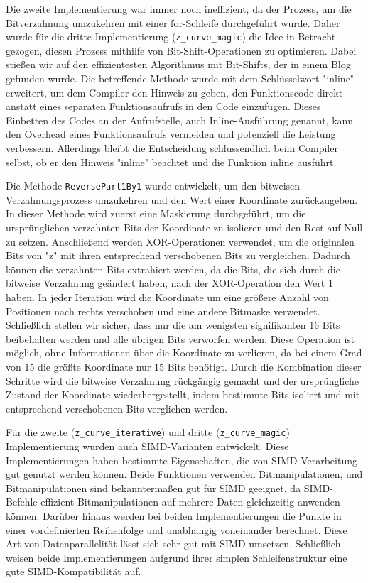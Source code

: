 \documentclass[course=erap]{aspdoc}
\begin{document}
\noindent Die zweite Implementierung war immer noch ineffizient, da der Prozess, um die Bitverzahnung umzukehren mit einer for-Schleife durchgeführt wurde. Daher wurde für die dritte Implementierung (\texttt{z\_curve\_magic}) die Idee in Betracht gezogen, diesen Prozess mithilfe von Bit-Shift-Operationen zu optimieren. Dabei stießen wir auf den effizientesten Algorithmus mit Bit-Shifts, der in einem Blog gefunden wurde. Die betreffende Methode wurde mit dem Schlüsselwort "inline" erweitert, um dem Compiler den Hinweis zu geben, den Funktionscode direkt anstatt eines separaten Funktionsaufrufs in den Code einzufügen. Dieses Einbetten des Codes an der Aufrufstelle, auch Inline-Ausführung genannt, kann den Overhead eines Funktionsaufrufs vermeiden und potenziell die Leistung verbessern. Allerdings bleibt die Entscheidung schlussendlich beim Compiler selbst, ob er den Hinweis "inline" beachtet und die Funktion inline ausführt.

\noindent Die Methode \texttt{ReversePart1By1} wurde entwickelt, um den bitweisen Verzahnungsprozess umzukehren und den Wert einer Koordinate zurückzugeben. In dieser Methode wird zuerst eine Maskierung durchgeführt, um die ursprünglichen verzahnten Bits der Koordinate zu isolieren und den Rest auf Null zu setzen. Anschließend werden XOR-Operationen verwendet, um die originalen Bits von "z" mit ihren entsprechend verschobenen Bits zu vergleichen. Dadurch können die verzahnten Bits extrahiert werden, da die Bits, die sich durch die bitweise Verzahnung geändert haben, nach der XOR-Operation den Wert 1 haben. In jeder Iteration wird die Koordinate um eine größere Anzahl von Positionen nach rechts verschoben und eine andere Bitmaske verwendet. Schließlich stellen wir sicher, dass nur die am wenigsten signifikanten 16 Bits beibehalten werden und alle übrigen Bits verworfen werden. Diese Operation ist möglich, ohne Informationen über die Koordinate zu verlieren, da bei einem Grad von 15 die größte Koordinate nur 15 Bits benötigt. Durch die Kombination dieser Schritte wird die bitweise Verzahnung rückgängig gemacht und der ursprüngliche Zustand der Koordinate wiederhergestellt, indem bestimmte Bits isoliert und mit entsprechend verschobenen Bits verglichen werden.

\noindent Für die zweite (\texttt{z\_curve\_iterative}) und dritte (\texttt{z\_curve\_magic}) Implementierung wurden auch SIMD-Varianten entwickelt. Diese Implementierungen haben bestimmte Eigenschaften, die von SIMD-Verarbeitung gut genutzt werden können. Beide Funktionen verwenden Bitmanipulationen, und Bitmanipulationen sind bekanntermaßen gut für SIMD geeignet, da SIMD-Befehle effizient Bitmanipulationen auf mehrere Daten gleichzeitig anwenden können. Darüber hinaus werden bei beiden Implementierungen die Punkte in einer vordefinierten Reihenfolge und unabhängig voneinander berechnet. Diese Art von Datenparallelität lässt sich sehr gut mit SIMD umsetzen. Schließlich weisen beide Implementierungen aufgrund ihrer simplen Schleifenstruktur eine gute SIMD-Kompatibilität auf.
\end{document}

